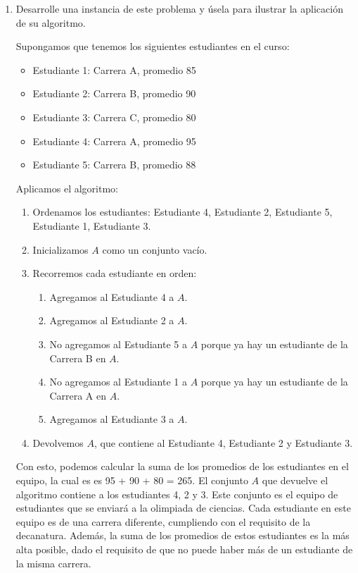\begin{problema}
\begin{enumerate}
\begin{sol}
        \end{sol}
        \item Desarrolle una instancia de este problema y úsela para ilustrar la aplicación de su algoritmo.
        \begin{sol}
             Supongamos que tenemos los siguientes estudiantes en el curso:
            \begin{itemize}
                \item Estudiante 1: Carrera A, promedio 85
                \item Estudiante 2: Carrera B, promedio 90
                \item Estudiante 3: Carrera C, promedio 80
                \item Estudiante 4: Carrera A, promedio 95
                \item Estudiante 5: Carrera B, promedio 88
            \end{itemize}


        Aplicamos el algoritmo:
        \begin{enumerate}
            \item Ordenamos los estudiantes: Estudiante 4, Estudiante 2, Estudiante 5, Estudiante 1, Estudiante 3.
            \item Inicializamos $A$ como un conjunto vacío.
            \item Recorremos cada estudiante en orden:
                \begin{enumerate}
                    \item Agregamos al Estudiante 4 a $A$.
                    \item Agregamos al Estudiante 2 a $A$.
                    \item No agregamos al Estudiante 5 a $A$ porque ya hay un estudiante de la Carrera B en $A$.
                    \item No agregamos al Estudiante 1 a $A$ porque ya hay un estudiante de la Carrera A en $A$.
                    \item Agregamos al Estudiante 3 a $A$.
                \end{enumerate}
               
            \item Devolvemos $A$, que contiene al Estudiante 4, Estudiante 2 y Estudiante 3.
        \end{enumerate}
        Con esto, podemos calcular la suma de los promedios de los estudiantes en el equipo, la cual es es 95 + 90 + 80 = 265. El conjunto $A$ que devuelve el algoritmo contiene a los estudiantes 4, 2 y 3. Este conjunto es el equipo de estudiantes que se enviará a la olimpiada de ciencias. Cada estudiante en este equipo es de una carrera diferente, cumpliendo con el requisito de la decanatura. Además, la suma de los promedios de estos estudiantes es la más alta posible, dado el requisito de que no puede haber más de un estudiante de la misma carrera.





\end{sol}
\end{enumerate}
\end{problema}
